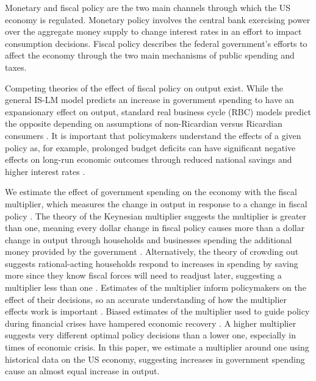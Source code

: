 
Monetary and fiscal policy are the two main channels through which the US economy is regulated.  Monetary policy involves the central bank exercising power over the aggregate money supply to change interest rates in an effort to impact consumption decisions.  Fiscal policy describes the federal government's efforts to affect the economy through the two main mechanisms of public spending and taxes.  



Competing theories of the effect of fiscal policy on output exist.  While the general IS-LM model predicts an increase in government spending to have an expansionary effect on output, standard real business cycle (RBC) models predict the opposite depending on assumptions of non-Ricardian versus Ricardian consumers \parencite{gali2007understanding}.  It is important that policymakers understand the effects of a given policy as, for example, prolonged budget deficits can have significant negative effects on long-run economic outcomes through reduced national savings and higher interest rates \parencite{gale2003economic}.

We estimate the effect of government spending on the economy with the fiscal multiplier, which measures the change in output in response to a change in fiscal policy \parencite{spilimbergo2009fiscal}.  The theory of the Keynesian multiplier suggests the multiplier is greater than one, meaning every dollar change in fiscal policy causes more than a dollar change in output through households and businesses spending the additional money provided by the government \parencite{barro2011macroeconomic}.  Alternatively, the theory of crowding out suggests rational-acting households respond to increases in spending by saving more since they know fiscal forces will need to readjust later, suggesting a multiplier less than one \parencite{berge2021fiscal}.  Estimates of the multiplier inform policymakers on the effect of their decisions, so an accurate understanding of how the multiplier effects work is important \parencite{eyraud2013challenge}.  Biased estimates of the multiplier used to guide policy during financial crises have hampered economic recovery \parencites{blanchard2013growth}{blanchard2014learning}.  A higher multiplier suggests very different optimal policy decisions than a lower one, especially in times of economic crisis.  In this paper, we estimate a multiplier around one using historical data on the US economy, suggesting increases in government spending cause an almost equal increase in output.


